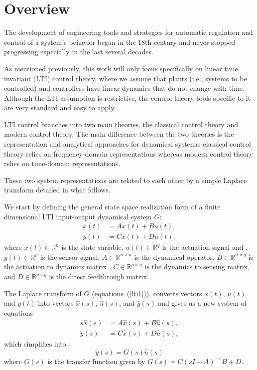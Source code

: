 \documentclass[12pt,lot, lof]{puthesis}
\begin{document}
\section{Overview}
The development of engineering tools and strategies for automatic regulation and control of a system's behavior began in the 18th century and never stopped progressing especially in the last several decades.

As mentioned previously, this work will only focus specifically on linear time invariant (LTI) control theory, where we assume that plants (i.e., systems to be controlled) and controllers have linear dynamics that do not change with time. Although the LTI assumption is restrictive, the control theory tools specific to it are very standard and easy to apply. 

 LTI control branches into two main theories, the classical control theory and modern control theory. The main difference between the two theories is the representation and analytical approaches for dynamical systems: classical control theory relies on frequency-domain representations whereas modern control theory relies on time-domain representations.
 
 These two system representations are related to each other by a simple Laplace transform detailed in what follows.
 
 We start by defining the general state space realization form of a finite dimensional LTI input-output dynamical system $G$:
 \begin{equation}
\label{lti1}
\begin{aligned}
	\dot{x}(t) &= A x(t)  + B u(t),   \\
	y(t) &= C x(t) +D u(t) ,
\end{aligned}
\end{equation}
%
 where $x (t)\in \mathbb{R}^n$ is the state variable, $u(t) \in \mathbb{R}^q$ is the actuation signal and , $y(t) \in \mathbb{R}^p$ is the sensor signal, $ A \in \mathbb{R}^ {n \times n}$ is the dynamical operator, $B \in \mathbb{R}^{n \times q}$ is the actuation to dynamics matrix , $C \in \mathbb{R}^{ p \times n}$ is the dynamics to sensing matrix, and $D \in \mathbb{R}^{p \times q}$ is the direct feedthrough matrix.

The Laplace transform of $G$ (equations~(\ref{lti1})), converts vectors $x(t)$, $u(t)$ and $y(t)$ into vectors $\hat{x}(s)$, $\hat{u}(s)$, and $\hat{y}(s)$ and gives us a new system of equations
\begin{equation}
\label{lti2}
\begin{aligned}
	s \hat{x}(s) &= A \hat{x}(s) + B \hat{u}(s),   \\
	\hat{y}(s) &= C \hat{x}(s)+D \hat{u}(s) ,
\end{aligned}
\end{equation}
which simplifies into 
%
\begin{equation}
\label{lti3}
\hat{y}(s) = G(s) \hat{u}(s) 
\end{equation}
where $G(s)$ is the transfer function given by $G(s) = C (sI - A)^{-1} B + D$.
\end{document}
